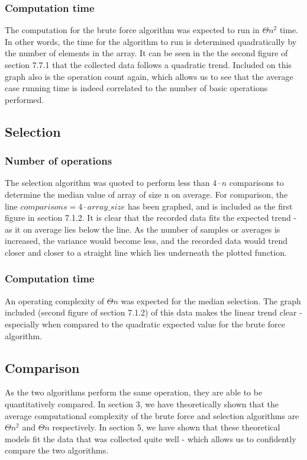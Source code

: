 \documentclass{article}
\begin{document}
        \subsubsection{Computation time}
            The computation for the brute force algorithm was expected to run in $\Theta{n^2}$ time. In other words, the time for the algorithm to run is determined quadratically by the number of elements in the array. It can be seen in the the second figure of section 7.7.1 that the collected data follows a quadratic trend. Included on this graph also is the operation count again, which allows us to see that the average case running time is indeed correlated to the number of basic operations performed.

    \subsection{Selection}
        \subsubsection{Number of operations}
            The selection algorithm was quoted to perform less than $4 \cdot n$ comparisons to determine the median value of array of size n on average. For comparison, the line $comparisons = 4 \cdot array\_size$ has been graphed, and is included as the first figure in section 7.1.2. It is clear that the recorded data fits the expected trend - as it on average lies below the line. As the number of samples or averages is increased, the variance would become less, and the recorded data would trend closer and closer to a straight line which lies underneath the plotted function.
        \subsubsection{Computation time}
            An operating complexity of $\Theta{n}$ was expected for the median selection. The graph included (second figure of section 7.1.2) of this data makes the linear trend clear - especially when compared to the quadratic expected value for the brute force algorithm.

    \subsection{Comparison}
        As the two algorithms perform the same operation, they are able to be quantitatively compared. In section 3, we have theoretically shown that the average computational complexity of the brute force and selection algorithms are $\Theta{n^2}$ and $\Theta{n}$ respectively. In section 5, we have shown that these theoretical models fit the data that was collected quite well - which allows us to confidently compare the two algorithms.
\end{document}
